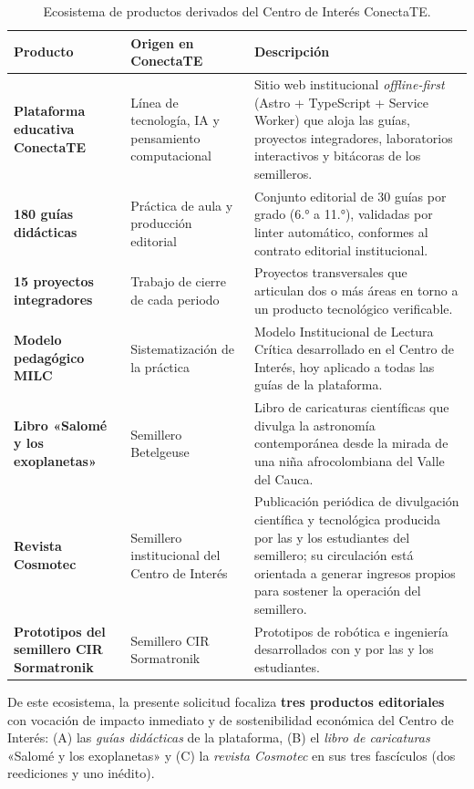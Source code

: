 \documentclass[12pt, letterpaper]{article}
\begin{document}
\renewcommand{\arraystretch}{1.30}
\begin{table}[H]
\centering
\small
\begin{tabularx}{\linewidth}{L{3.6cm} L{3.0cm} X}
\toprule
{}
\textbf{Producto} & \textbf{Origen en ConectaTE} & \textbf{Descripción} \\
\midrule
\textbf{Plataforma educativa ConectaTE} & Línea de tecnología, IA y pensamiento computacional & Sitio web institucional \textit{offline-first} (Astro + TypeScript + Service Worker) que aloja las guías, proyectos integradores, laboratorios interactivos y bitácoras de los semilleros. \\
\textbf{180 guías didácticas} & Práctica de aula y producción editorial & Conjunto editorial de 30 guías por grado (6.°{} a 11.°{}), validadas por linter automático, conformes al contrato editorial institucional. \\
\textbf{15 proyectos integradores} & Trabajo de cierre de cada periodo & Proyectos transversales que articulan dos o más áreas en torno a un producto tecnológico verificable. \\
\textbf{Modelo pedagógico MILC} & Sistematización de la práctica & Modelo Institucional de Lectura Crítica desarrollado en el Centro de Interés, hoy aplicado a todas las guías de la plataforma. \\
\textbf{Libro «Salomé y los exoplanetas»} & Semillero Betelgeuse & Libro de caricaturas científicas que divulga la astronomía contemporánea desde la mirada de una niña afrocolombiana del Valle del Cauca. \\
\textbf{Revista Cosmotec} & Semillero institucional del Centro de Interés & Publicación periódica de divulgación científica y tecnológica producida por las y los estudiantes del semillero; su circulación está orientada a generar ingresos propios para sostener la operación del semillero. \\
\textbf{Prototipos del semillero CIR Sormatronik} & Semillero CIR Sormatronik & Prototipos de robótica e ingeniería desarrollados con y por las y los estudiantes. \\
\bottomrule
\end{tabularx}
\caption{Ecosistema de productos derivados del Centro de Interés ConectaTE.}
\end{table}

De este ecosistema, la presente solicitud focaliza \textbf{tres productos editoriales} con vocación de impacto inmediato y de sostenibilidad económica del Centro de Interés: (A) las \textit{guías didácticas} de la plataforma, (B) el \textit{libro de caricaturas} «Salomé y los exoplanetas» y (C) la \textit{revista Cosmotec} en sus tres fascículos (dos reediciones y uno inédito).
\end{document}
